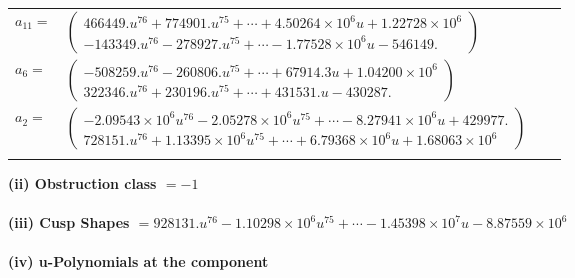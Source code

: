 \documentclass[1p]{elsarticle_modified}
\theoremstyle{definition}
\begin{document}
\begin{tabular}{m{7pt} m{180pt} m{7pt} m{180pt} }
\flushright $a_{11}=$&$\begin{pmatrix}466449. u^{76}+774901. u^{75}+\cdots+4.50264\times10^{6} u+1.22728\times10^{6}\\-143349. u^{76}-278927. u^{75}+\cdots-1.77528\times10^{6} u-546149.\end{pmatrix}$ \\
\flushright $a_{6}=$&$\begin{pmatrix}-508259. u^{76}-260806. u^{75}+\cdots+67914.3 u+1.04200\times10^{6}\\322346. u^{76}+230196. u^{75}+\cdots+431531. u-430287.\end{pmatrix}$ \\
\flushright $a_{2}=$&$\begin{pmatrix}-2.09543\times10^{6} u^{76}-2.05278\times10^{6} u^{75}+\cdots-8.27941\times10^{6} u+429977.\\728151. u^{76}+1.13395\times10^{6} u^{75}+\cdots+6.79368\times10^{6} u+1.68063\times10^{6}\end{pmatrix}$\\&\end{tabular}
\flushleft \textbf{(ii) Obstruction class $= -1$}\\~\\
\flushleft \textbf{(iii) Cusp Shapes $= 928131. u^{76}-1.10298\times10^{6} u^{75}+\cdots-1.45398\times10^{7} u-8.87559\times10^{6}$}\\~\\
\newpage\renewcommand{\arraystretch}{1}
\flushleft \textbf{(iv) u-Polynomials at the component}\newline \\
\end{document}
